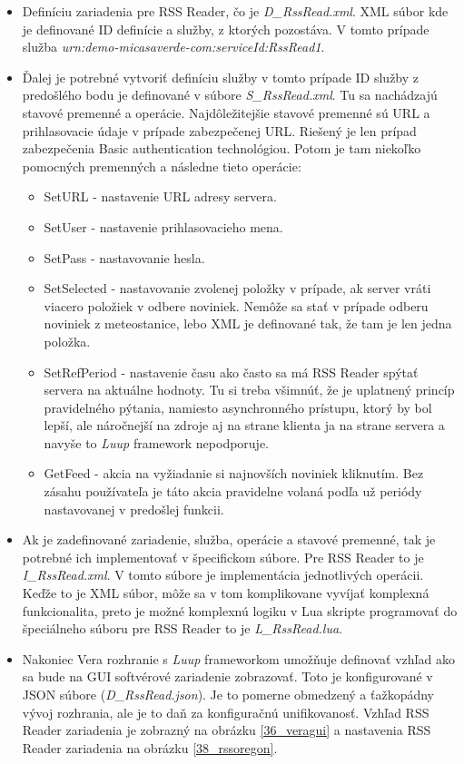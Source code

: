 \begin{itemize}
  \item Definíciu zariadenia pre RSS Reader, čo je \textit{D\_RssRead.xml}. XML súbor kde je definované ID definície a služby, z ktorých pozostáva. V tomto prípade služba \textit{urn:demo-micasaverde-com:serviceId:RssRead1}.
  \item Ďalej je potrebné vytvoriť definíciu služby v tomto prípade ID služby z predošlého bodu je definované v súbore \textit{S\_RssRead.xml}. Tu sa nachádzajú stavové premenné a operácie. Najdôležitejšie stavové premenné sú URL a prihlasovacie údaje v prípade zabezpečenej URL. Riešený je len prípad zabezpečenia Basic authentication technológiou. Potom je tam niekoľko pomocných premenných a následne tieto operácie:
  \begin{itemize}
    \item SetURL - nastavenie URL adresy servera.
    \item SetUser - nastavenie prihlasovacieho mena.
    \item SetPass - nastavovanie hesla.
    \item SetSelected - nastavovanie zvolenej položky v prípade, ak server vráti viacero položiek v odbere noviniek. Nemôže sa stať v prípade odberu noviniek z meteostanice, lebo XML je definované tak, že tam je len jedna položka.
    \item SetRefPeriod - nastavenie času ako často sa má RSS Reader spýtať servera na aktuálne hodnoty. Tu si treba všimnúť, že je uplatnený princíp pravidelného pýtania, namiesto asynchronného prístupu, ktorý by bol lepší, ale náročnejší na zdroje aj na strane klienta ja na strane servera a navyše to \textit{Luup} framework nepodporuje.
    \item GetFeed - akcia na vyžiadanie si najnovších noviniek kliknutím. Bez zásahu používateľa je táto akcia pravidelne volaná podľa už periódy nastavovanej v predošlej funkcii.
  \end{itemize}  
  \item Ak je zadefinované zariadenie, služba, operácie a stavové premenné, tak je potrebné ich implementovať v špecifickom súbore. Pre RSS Reader to je \textit{I\_RssRead.xml}. V tomto súbore je implementácia jednotlivých operácii. Keďže to je XML súbor, môže sa v tom komplikovane vyvíjať komplexná funkcionalita, preto je možné komplexnú logiku v Lua skripte programovať do špeciálneho súboru pre RSS Reader to je \textit{L\_RssRead.lua}. 
  \item Nakoniec Vera rozhranie s \textit{Luup} frameworkom umožňuje definovať vzhľad ako sa bude na GUI softvérové zariadenie zobrazovať. Toto je konfigurované v JSON súbore (\textit{D\_RssRead.json}). Je to pomerne obmedzený a ťažkopádny vývoj rozhrania, ale je to daň za konfiguračnú unifikovanosť. Vzhľad RSS Reader zariadenia je zobrazný na obrázku  \ref{36_veragui} a nastavenia RSS Reader zariadenia na obrázku \ref{38_rssoregon}.  
\end{itemize}
